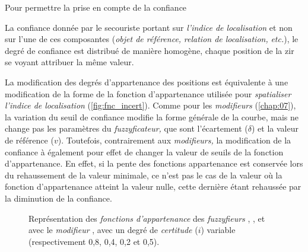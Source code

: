 Pour permettre la prise en compte de la confiance


La confiance donnée par le secouriste portant sur \emph{l'indice de
  localisation} et non sur l'une de ces composantes (\eg \emph{objet
  de référence,} \emph{relation de localisation,} \emph{etc.}), le
degré de confiance est distribué de manière homogène, chaque position
de la \ac{zir} se voyant attribuer la même valeur.


La modification des degrés d'appartenance des positions est
équivalente à une modification de la forme de la fonction
d'appartenance utilisée pour \emph{spatialiser l'indice de
  localisation} (\autoref{fig:fnc_incert}). Comme pour les
\emph{modifieurs} (\autoref{chap:07}), la variation du seuil de
confiance modifie la forme générale de la courbe, mais ne change pas
les paramètres du \emph{fuzzyficateur,} que sont l'écartement
(\(\delta\)) et la valeur de référence (\(v\)). Toutefois,
contrairement aux \emph{modifieurs,} la modification de la confiance à
également pour effet de changer la valeur de seuils de la fonction
d'appartenance. En effet, si la pente des fonctions appartenance est
conservée lors du rehaussement de la valeur minimale, ce n'est pas le
cas de la valeur où la fonction d'appartenance atteint la valeur
nulle, cette dernière étant rehaussée par la diminution de la
confiance.

\begin{figure}
  \centering  \subfloat[\label{fig:fnc_app_inc}]{}\hfill
  \subfloat[\label{fig:fnc_app_inc_2}]{}

  \subfloat[\label{fig:fnc_app_inc_3}]{}\hfill
  \subfloat[\label{fig:fnc_app_inc_4}]{}
  \caption[Représentation des \emph{fonctions d'appartenance} de
  différents \emph{fuzzyfieurs} avec une
  \emph{incertitude}]{Représentation des \emph{fonctions
      d'appartenance} des \emph{fuzzyfieurs}
    \protect{} \protect{},
    \protect{} \protect{},
    \protect{} \protect{}
    et \protect{} avec le \emph{modifieur}
    \protect{} \protect{}, avec
    un degré de \emph{certitude} (\(i\)) variable (respectivement
    0,8, 0,4, 0,2 et 0,5).}
  \label{fig:fnc_incert}
\end{figure}

